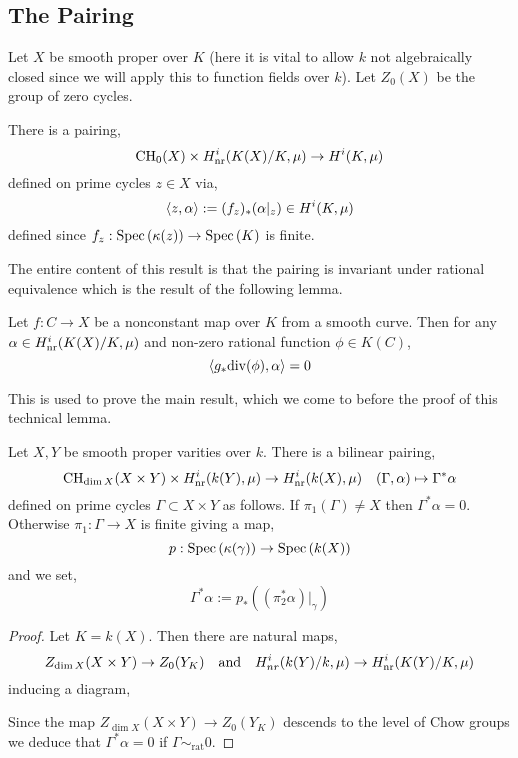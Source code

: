 \documentclass[12pt]{article}
\begin{document}
\subsection{The Pairing}

Let $X$ be smooth proper over $K$ (here it is vital to allow $k$ not algebraically closed since we will apply this to function fields over $k$). Let $Z_0(X)$ be the group of zero cycles. 

\begin{prop}
There is a pairing,
\[ \mathrm{CH}_0(X) \times H^i_{\mathrm{nr}}(K(X)/K, \mu) \to H^i(K, \mu) \]
defined on prime cycles $z \in X$ via,
\[ \left< z, \alpha \right> := (f_z)_* (\alpha|_z) \in H^i(K, \mu) \]
defined since $f_z : \mathrm{Spec}\left( \kappa(z) \right) \to \mathrm{Spec}\left( K \right)$ is finite.
\end{prop}

The entire content of this result is that the pairing is invariant under rational equivalence which is the result of the following lemma.

\begin{lemma}
Let $f : C \to X$ be a nonconstant map over $K$ from a smooth curve. Then for any $\alpha \in H^i_{\mathrm{nr}}(K(X)/K, \mu)$ and non-zero rational function $\phi \in K(C)$,
\[ \left< g_* \mathrm{div}(\phi), \alpha \right> = 0 \]
\end{lemma}

\begin{rmk}
This is used to prove the main result, which we come to before the proof of this technical lemma.
\end{rmk}

\begin{theorem}
Let $X, Y$ be smooth proper varities over $k$. There is a bilinear pairing,
\[ \mathrm{CH}_{\dim{X}}(X \times Y) \times H_{\mathrm{nr}}^i(k(Y), \mu) \to H_{\mathrm{nr}}^i(k(X), \mu) \quad (\Gamma, \alpha) \mapsto \Gamma^* \alpha \]
defined on prime cycles $\Gamma \subset X \times Y$ as follows. If $\pi_1(\Gamma) \neq X$ then $\Gamma^* \alpha = 0$. Otherwise $\pi_1 : \Gamma \to X$ is finite giving a map,
\[ p : \mathrm{Spec}\left( \kappa(\gamma) \right) \to \mathrm{Spec}\left( k(X) \right) \]
and we set,
\[ \Gamma^* \alpha := p_*( (\pi_2^* \alpha)|_\gamma ) \] 
\end{theorem}

\begin{proof}
Let $K = k(X)$. Then there are natural maps,
\[ Z_{\dim{X}}(X \times Y) \to Z_0(Y_K) \quad \text{and} \quad H_{nr}^i(k(Y)/k, \mu) \to H_{\mathrm{nr}}^i(K(Y)/K, \mu) \]
inducing a diagram,
\begin{center}
\end{center}
Since the map $Z_{\dim{X}}(X \times Y) \to Z_0(Y_K)$ descends to the level of Chow groups we deduce that $\Gamma^* \alpha = 0$ if $\Gamma \sim_{\text{rat}} 0$.
\end{proof}
\end{document}
